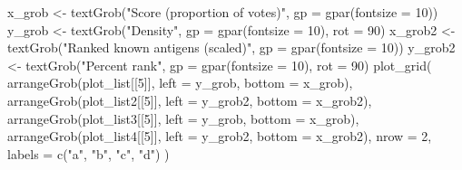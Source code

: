 \documentclass[
  11pt,
  oneside]{book}
\newenvironment{Shaded}{\begin{snugshade}}{\end{snugshade}}
\newcommand{\AttributeTok}[1]{\textcolor[rgb]{0.77,0.63,0.00}{#1}}
\newcommand{\DecValTok}[1]{\textcolor[rgb]{0.00,0.00,0.81}{#1}}
\newcommand{\FunctionTok}[1]{\textcolor[rgb]{0.00,0.00,0.00}{#1}}
\newcommand{\NormalTok}[1]{#1}
\newcommand{\OtherTok}[1]{\textcolor[rgb]{0.56,0.35,0.01}{#1}}
\newcommand{\StringTok}[1]{\textcolor[rgb]{0.31,0.60,0.02}{#1}}
\begin{document}
\begin{Shaded}
\begin{Highlighting}[]
\NormalTok{x\_grob }\OtherTok{\textless{}{-}} \FunctionTok{textGrob}\NormalTok{(}\StringTok{"Score (proportion of votes)"}\NormalTok{, }\AttributeTok{gp =} \FunctionTok{gpar}\NormalTok{(}\AttributeTok{fontsize =} \DecValTok{10}\NormalTok{))}
\NormalTok{y\_grob }\OtherTok{\textless{}{-}} \FunctionTok{textGrob}\NormalTok{(}\StringTok{"Density"}\NormalTok{, }\AttributeTok{gp =} \FunctionTok{gpar}\NormalTok{(}\AttributeTok{fontsize =} \DecValTok{10}\NormalTok{), }\AttributeTok{rot =} \DecValTok{90}\NormalTok{)}
\NormalTok{x\_grob2 }\OtherTok{\textless{}{-}} \FunctionTok{textGrob}\NormalTok{(}\StringTok{"Ranked known antigens (scaled)"}\NormalTok{, }\AttributeTok{gp =} \FunctionTok{gpar}\NormalTok{(}\AttributeTok{fontsize =} \DecValTok{10}\NormalTok{))}
\NormalTok{y\_grob2 }\OtherTok{\textless{}{-}} \FunctionTok{textGrob}\NormalTok{(}\StringTok{"Percent rank"}\NormalTok{, }\AttributeTok{gp =} \FunctionTok{gpar}\NormalTok{(}\AttributeTok{fontsize =} \DecValTok{10}\NormalTok{), }\AttributeTok{rot =} \DecValTok{90}\NormalTok{)}
\FunctionTok{plot\_grid}\NormalTok{(}
  \FunctionTok{arrangeGrob}\NormalTok{(plot\_list[[}\DecValTok{5}\NormalTok{]], }\AttributeTok{left =}\NormalTok{ y\_grob, }\AttributeTok{bottom =}\NormalTok{ x\_grob),}
  \FunctionTok{arrangeGrob}\NormalTok{(plot\_list2[[}\DecValTok{5}\NormalTok{]], }\AttributeTok{left =}\NormalTok{ y\_grob2, }\AttributeTok{bottom =}\NormalTok{ x\_grob2),}
  \FunctionTok{arrangeGrob}\NormalTok{(plot\_list3[[}\DecValTok{5}\NormalTok{]], }\AttributeTok{left =}\NormalTok{ y\_grob, }\AttributeTok{bottom =}\NormalTok{ x\_grob),}
  \FunctionTok{arrangeGrob}\NormalTok{(plot\_list4[[}\DecValTok{5}\NormalTok{]], }\AttributeTok{left =}\NormalTok{ y\_grob2, }\AttributeTok{bottom =}\NormalTok{ x\_grob2),}
  \AttributeTok{nrow =} \DecValTok{2}\NormalTok{, }\AttributeTok{labels =} \FunctionTok{c}\NormalTok{(}\StringTok{"a"}\NormalTok{, }\StringTok{"b"}\NormalTok{, }\StringTok{"c"}\NormalTok{, }\StringTok{"d"}\NormalTok{)}
\NormalTok{)}
\end{Highlighting}
\end{Shaded}
\end{document}
